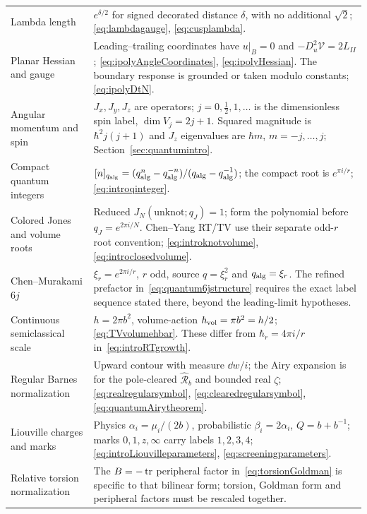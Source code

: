 \begin{longtable}{@{}>{\raggedright\arraybackslash}p{}
 >{\raggedright\arraybackslash}p{}@{}}
Lambda length & $e^{\delta/2}$ for signed decorated distance $\delta$, with no additional $\sqrt2$; \eqref{eq:lambdagauge}, \eqref{eq:cusplambda}.\\
Planar Hessian and gauge & Leading--trailing coordinates have $u|_B=0$ and $-D_u^2\mathcal V=2L_{II}$; \eqref{eq:ipolyAngleCoordinates}, \eqref{eq:ipolyHessian}. The boundary response is grounded or taken modulo constants; \eqref{eq:ipolyDtN}.\\
Angular momentum and spin & $J_x,J_y,J_z$ are operators; $j=0,\frac12,1,\ldots$ is the dimensionless spin label, $\dim V_j=2j+1$. Squared magnitude is $\hbar^2j(j+1)$ and $J_z$ eigenvalues are $\hbar m$, $m=-j,\ldots,j$; Section~\ref{sec:quantumintro}.\\

Compact quantum integers & $[n]_{q_{\rm alg}}=(q_{\rm alg}^n-q_{\rm alg}^{-n})/(q_{\rm alg}-q_{\rm alg}^{-1})$; the compact root is $e^{\pi i/r}$; \eqref{eq:introqinteger}.\\
Colored Jones and volume roots & Reduced $J_N(\text{unknot};q_J)=1$; form the polynomial before $q_J=e^{2\pi i/N}$. Chen--Yang RT/TV use their separate odd-$r$ root convention; \eqref{eq:introknotvolume}, \eqref{eq:introclosedvolume}.\\
Chen--Murakami $6j$ & $\xi_r=e^{2\pi i/r}$, $r$ odd, source $q=\xi_r^2$ and $q_{\rm alg}=\xi_r$. The refined prefactor in~\eqref{eq:quantum6jstructure} requires the exact label sequence stated there, beyond the leading-limit hypotheses.\\
Continuous semiclassical scale & $h=2\pi b^2$, volume-action $\hbar_{\rm vol}=\pi b^2=h/2$; \eqref{eq:TVvolumehbar}. These differ from $\hbar_r=4\pi i/r$ in~\eqref{eq:introRTgrowth}.\\
Regular Barnes normalization & Upward contour with measure $\dd w/i$; the Airy expansion is for the pole-cleared $\widehat{\mathcal R}_b$ and bounded real $\zeta$; \eqref{eq:realregularsymbol}, \eqref{eq:clearedregularsymbol}, \eqref{eq:quantumAirytheorem}.\\
Liouville charges and marks & Physics $\alpha_i=\mu_i/(2b)$, probabilistic $\beta_i=2\alpha_i$, $Q=b+b^{-1}$; marks $0,1,z,\infty$ carry labels $1,2,3,4$; \eqref{eq:introLiouvilleparameters}, \eqref{eq:screeningparameters}.\\
Relative torsion normalization & The $B=-\operatorname{tr}$ peripheral factor in~\eqref{eq:torsionGoldman} is specific to that bilinear form; torsion, Goldman form and peripheral factors must be rescaled together.\\

\end{longtable}
